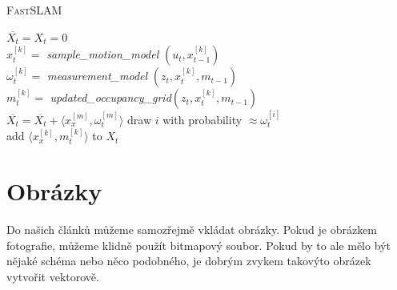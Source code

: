 \documentclass[a4paper,11pt]{article}
\begin{document}
\bigskip
\begin{algorithm}[H]
\caption{\textsc{FastSLAM}}
\label{algoritmus:FastSLAM}
\SetAlgoNoLine
\SetNlSty{}{}{: }
\SetNlSkip{-1.33em}
\SetInd{1em}{1em}
\BlankLine
\Indp
    $\overline{X_{t}} = X_{t} = 0$ \\
    { 
     $x^{[k]}_{t} =$ \emph{ sample\_motion\_model} $(u_{t},x^{[k]}_{t-1})$ \\
     $\omega^{[k]}_{t} =$ \emph{ measurement\_model} $(z_{t},x^{[k]}_{t},m_{t-1})$\\
     $m^{[k]}_{t} =$ \emph{updated\_occupancy\_grid}$(z_{t},x^{[k]}_{t},m_{t-1})$ \\
         $\overline{X_t} = \overline{X_t} + \langle 
     x^{[m]}_x,\omega^{[m]}_t\rangle$
    }
    {
        draw $i$ with probability $\approx \omega^{[i]}_t$ \\
        add $\langle x^{[k]}_x,m^{[k]}_t\rangle$ to $X_t$\\
    }
\end{algorithm}

\bigskip
\section{Obrázky}
Do našich článků můžeme samozřejmě vkládat obrázky. Pokud je obrázkem fotografie, můžeme klidně použít bitmapový soubor. Pokud by to ale mělo být nějaké schéma nebo něco podobného, je dobrým zvykem takovýto obrázek vytvořit vektorově. 
\end{document}

